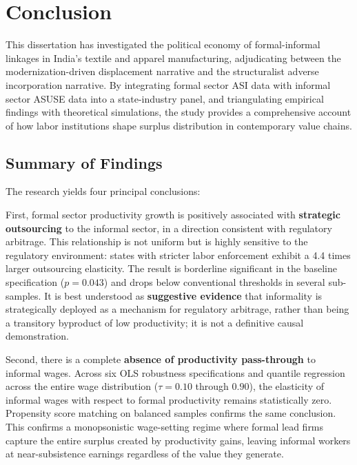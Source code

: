 \chapter{Conclusion}
\label{ch:conclusion}

This dissertation has investigated the political economy of formal-informal linkages in India's textile and apparel manufacturing, adjudicating between the modernization-driven displacement narrative and the structuralist adverse incorporation narrative. By integrating formal sector ASI data with informal sector ASUSE data into a state-industry panel, and triangulating empirical findings with theoretical simulations, the study provides a comprehensive account of how labor institutions shape surplus distribution in contemporary value chains.

\section{Summary of Findings}
\label{sec:summary_findings}

The research yields four principal conclusions:

First, formal sector productivity growth is positively associated with \textbf{strategic outsourcing} to the informal sector, in a direction consistent with regulatory arbitrage. This relationship is not uniform but is highly sensitive to the regulatory environment: states with stricter labor enforcement exhibit a 4.4 times larger outsourcing elasticity. The result is borderline significant in the baseline specification ($p = 0.043$) and drops below conventional thresholds in several sub-samples. It is best understood as \textbf{suggestive evidence} that informality is strategically deployed as a mechanism for regulatory arbitrage, rather than being a transitory byproduct of low productivity; it is not a definitive causal demonstration.

Second, there is a complete \textbf{absence of productivity pass-through} to informal wages. Across six OLS robustness specifications and quantile regression across the entire wage distribution ($\tau = 0.10$ through $0.90$), the elasticity of informal wages with respect to formal productivity remains statistically zero. Propensity score matching on balanced samples confirms the same conclusion. This confirms a monopsonistic wage-setting regime where formal lead firms capture the entire surplus created by productivity gains, leaving informal workers at near-subsistence earnings regardless of the value they generate.


